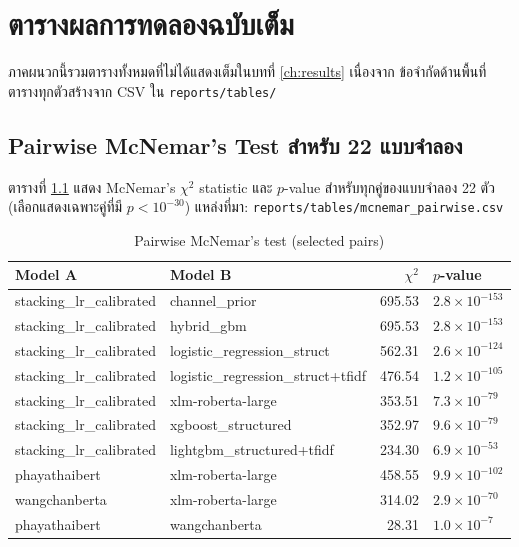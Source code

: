 \chapter{ตารางผลการทดลองฉบับเต็ม}
\label{app:tables}

ภาคผนวกนี้รวมตารางทั้งหมดที่ไม่ได้แสดงเต็มในบทที่ \ref{ch:results} เนื่องจาก
ข้อจำกัดด้านพื้นที่ ตารางทุกตัวสร้างจาก CSV ใน \texttt{reports/tables/}

\section{Pairwise McNemar's Test สำหรับ 22 แบบจำลอง}
\label{app:mcnemar-full}

ตารางที่ \ref{tab:mcnemar-full} แสดง McNemar's $\chi^2$ statistic และ
$p$-value สำหรับทุกคู่ของแบบจำลอง 22 ตัว (เลือกแสดงเฉพาะคู่ที่มี $p < 10^{-30}$)
แหล่งที่มา: \texttt{reports/tables/mcnemar\_pairwise.csv}

\begingroup\footnotesize
\begin{longtable}{p{4.5cm}p{4.5cm}rl}
\caption{Pairwise McNemar's test (selected pairs)}
\label{tab:mcnemar-full} \\
\toprule
\textbf{Model A} & \textbf{Model B} & \textbf{$\chi^2$} & \textbf{$p$-value} \\
\midrule
\endhead
stacking\_lr\_calibrated & channel\_prior            & 695.53 & $2.8\!\times\!10^{-153}$ \\
stacking\_lr\_calibrated & hybrid\_gbm               & 695.53 & $2.8\!\times\!10^{-153}$ \\
stacking\_lr\_calibrated & logistic\_regression\_struct   & 562.31 & $2.6\!\times\!10^{-124}$ \\
stacking\_lr\_calibrated & logistic\_regression\_struct+tfidf & 476.54 & $1.2\!\times\!10^{-105}$ \\
stacking\_lr\_calibrated & xlm-roberta-large          & 353.51 & $7.3\!\times\!10^{-79}$ \\
stacking\_lr\_calibrated & xgboost\_structured        & 352.97 & $9.6\!\times\!10^{-79}$ \\
stacking\_lr\_calibrated & lightgbm\_structured+tfidf & 234.30 & $6.9\!\times\!10^{-53}$ \\
phayathaibert            & xlm-roberta-large          & 458.55 & $9.9\!\times\!10^{-102}$ \\
wangchanberta            & xlm-roberta-large          & 314.02 & $2.9\!\times\!10^{-70}$ \\
phayathaibert            & wangchanberta              & 28.31  & $1.0\!\times\!10^{-7}$ \\
\bottomrule
\end{longtable}
\endgroup

